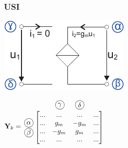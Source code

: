 \documentclass[a4paper,twocolumn,10pt]{article}
\newcommand*\kreis[1]{\unitlength1ex\begin{picture}(2.5,2.5)%
\put(0.75,0.75){\circle{3}}\put(0.7,0.7){\makebox(0,0){#1}}\end{picture}}
\begin{document}
\subsubsection*{USI}
\begin{minipage}[b]{0.20\textwidth}
\includegraphics[width=\textwidth]{Grafiken/KSA_USI}
\end{minipage}
\hfill
\begin{minipage}[b]{0.28\textwidth}
$\textbf{Y}_k=\;\;\begin{matrix}\begin{matrix} & & \;\;\;\kreis{$\gamma$} & \;\;\;\kreis{$\delta$} & \end{matrix}\\\begin{matrix} \; \\ \kreis{$\alpha$} \\ \kreis{$\beta$} \\ \; \end{matrix} \left[\begin{matrix} ... & ... & ... & ... \\ ... & g_m & -g_m & ... \\ ... & -g_m & g_m & ... \\ ...& ... & ... & ... \end{matrix}\right]\\ \; \end{matrix}$\\
\end{minipage}
\end{document}
